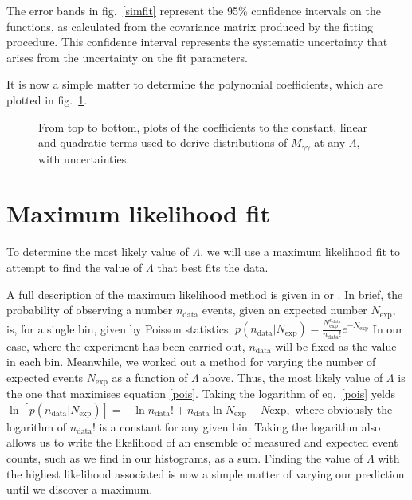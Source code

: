 The error bands in fig.~\ref{simfit} represent the 95\% confidence intervals on the functions, as calculated from the covariance matrix produced by the fitting procedure. This confidence interval represents the systematic uncertainty that arises from the uncertainty on the fit parameters.

It is now a simple matter to determine the polynomial coefficients, which are plotted in fig.~\ref{coef}.

\begin{figure}[hbt]
\begin{minipage}[b]{.69\textwidth}
\begin{infilsf}\tiny

\end{infilsf}
\end{minipage}\hfill
\begin{minipage}[b]{.3\textwidth}
\caption{From top to bottom, plots of the coefficients to the constant, linear and quadratic terms used to derive distributions of $M_{\gamma\gamma}$ at any $\Lambda$, with uncertainties.}\label{coef}
\end{minipage}
\end{figure}

\section{Maximum likelihood fit}
To determine the most likely value of $\Lambda$, we will use a maximum likelihood fit to attempt to find the value of $\Lambda$ that best fits the data.

A full description of the maximum likelihood method is given in \cite{barlow} or \cite{pdg}. In brief, the probability of observing a number $n_\text{data}$ events, given an expected number $N_\text{exp}$, is, for a single bin, given by Poisson statistics:
\(p(n_\text{data}|N_\text{exp})=\frac{N_\text{exp}^{n_\text{data}}}{n_\text{data}!}e^{-N_\text{exp}}\label{pois}\)
In our case, where the experiment has been carried out, $n_\text{data}$ will be fixed as the value in each bin. Meanwhile, we worked out a method for varying the number of expected events $N_\text{exp}$ as a function of $\Lambda$ above. Thus, the most likely value of $\Lambda$ is the one that maximises equation \eqref{pois}. Taking the logarithm of eq.~\eqref{pois} yelds
\(\ln[p(n_\text{data}|N_\text{exp})]=-\ln n_\text{data}!+n_\text{data}\ln N_\text{exp}-N\text{exp},\)
where obviously the logarithm of $n_\text{data}!$ is a constant for any given bin. Taking the logarithm also allows us to write the likelihood of an ensemble of measured and expected event counts, such as we find in our histograms, as a sum. Finding the value of $\Lambda$ with the highest likelihood associated is now a simple matter of varying our prediction until we discover a maximum.

